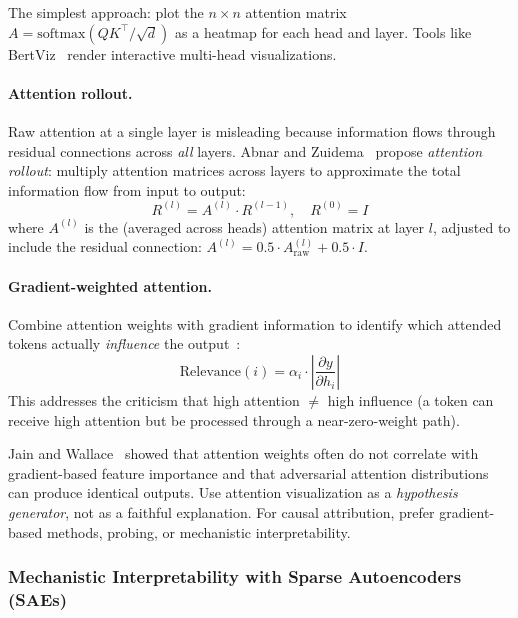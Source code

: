 The simplest approach: plot the $n \times n$ attention matrix $A = \text{softmax}(QK^\top/\sqrt{d})$ as a heatmap for each head and layer. Tools like BertViz~\cite{vig2019bertviz} render interactive multi-head visualizations.

\paragraph{Attention rollout.}
\label{attention-rollout.}

Raw attention at a single layer is misleading because information flows through residual connections across \emph{all} layers. Abnar and Zuidema~\cite{abnar2020quantifying} propose \emph{attention rollout}: multiply attention matrices across layers to approximate the total information flow from input to output: 
\[
R^{(l)} = A^{(l)} \cdot R^{(l-1)}, \quad R^{(0)} = I
\]
 where $A^{(l)}$ is the (averaged across heads) attention matrix at layer $l$, adjusted to include the residual connection: $A^{(l)} = 0.5 \cdot A^{(l)}_{\text{raw}} + 0.5 \cdot I$.

\paragraph{Gradient-weighted attention.}
\label{gradient-weighted-attention.}

Combine attention weights with gradient information to identify which attended tokens actually \emph{influence} the output~\cite{barkan2021grad}: 
\[
\text{Relevance}(i) = \alpha_i \cdot \left|\frac{\partial y}{\partial h_i}\right|
\]
 This addresses the criticism that high attention $\neq$ high influence (a token can receive high attention but be processed through a near-zero-weight path).

\begin{warningbox}
Jain and Wallace~\cite{jain2019attention} showed that attention weights often do not correlate with gradient-based feature importance and that adversarial attention distributions can produce identical outputs. Use attention visualization as a \emph{hypothesis generator}, not as a faithful explanation. For causal attribution, prefer gradient-based methods, probing, or mechanistic interpretability.
\end{warningbox}

\subsubsection{Mechanistic Interpretability with Sparse Autoencoders (SAEs)}
\label{mechanistic-interpretability-with-sparse-autoencoders-saes}

